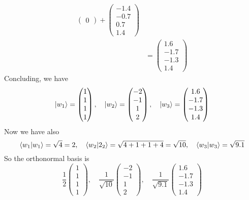 \documentclass[10pt]{article}
\begin{document}
\begin{align*}
\begin{pmatrix}
               0
               \end{pmatrix} + \begin{pmatrix}
               -1.4 \\
               -0.7 \\
               0.7 \\
               1.4
               \end{pmatrix} \\
               &= \begin{pmatrix}
               1.6 \\
               -1.7 \\
               -1.3 \\
               1.4
               \end{pmatrix}
\end{align*}
Concluding, we have
\[
\ket{w_1} = \begin{pmatrix}
1 \\
1 \\
1 \\
1 
\end{pmatrix}, \quad \ket{w_2} = \begin{pmatrix}
-2 \\
-1 \\
1 \\
2
\end{pmatrix}, \quad \ket{w_3} = \begin{pmatrix}
1.6 \\
-1.7 \\
-1.3 \\
1.4
\end{pmatrix}
\]
Now we have also 
\[
\braket{ w_1 | w_1 } = \sqrt{4} = 2, \quad \braket{ w_2 | 2_2 } = \sqrt{ 4 + 1 + 1 + 4 } = \sqrt{10}, \quad \braket{ w_3 | w_3 } = \sqrt{ 9.1 }
\]
So the orthonormal basis is 
\[
\frac{1}{2} \begin{pmatrix}
1 \\
1 \\
1 \\
1
\end{pmatrix}, \quad \frac{1}{\sqrt{10}} \begin{pmatrix}
-2 \\
-1 \\
1 \\
2
\end{pmatrix}, \quad \frac{1}{\sqrt{9.1}} \begin{pmatrix}
1.6 \\
-1.7 \\
-1.3 \\
1.4
\end{pmatrix}
\]
\end{document}
